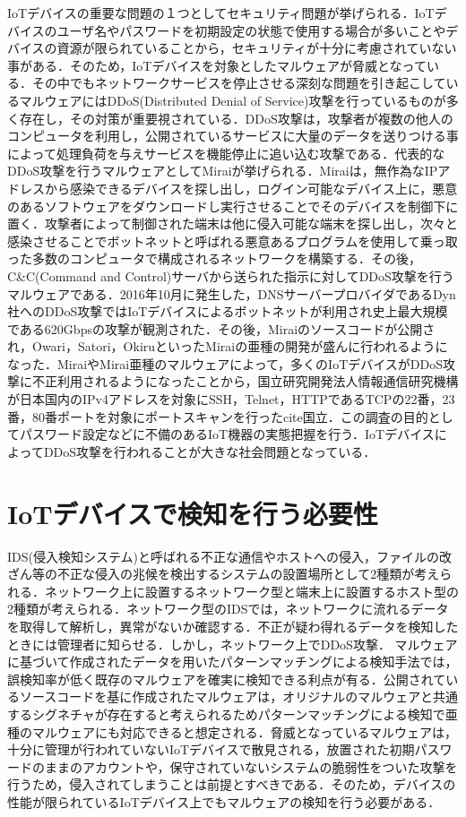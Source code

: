 IoTデバイスの重要な問題の１つとしてセキュリティ問題が挙げられる．IoTデバイスのユーザ名やパスワードを初期設定の状態で使用する場合が多いことやデバイスの資源が限られていることから，セキュリティが十分に考慮されていない事がある．そのため，IoTデバイスを対象としたマルウェアが脅威となっている．その中でもネットワークサービスを停止させる深刻な問題を引き起こしているマルウェアにはDDoS(Distributed Denial of Service)攻撃を行っているものが多く存在し，その対策が重要視されている．DDoS攻撃は，攻撃者が複数の他人のコンピュータを利用し，公開されているサービスに大量のデータを送りつける事によって処理負荷を与えサービスを機能停止に追い込む攻撃である．代表的なDDoS攻撃を行うマルウェアとしてMiraiが挙げられる．Mirai\cite{Mirai}は，無作為なIPアドレスから感染できるデバイスを探し出し，ログイン可能なデバイス上に，悪意のあるソフトウェアをダウンロードし実行させることでそのデバイスを制御下に置く．攻撃者によって制御された端末は他に侵入可能な端末を探し出し，次々と感染させることでボットネットと呼ばれる悪意あるプログラムを使用して乗っ取った多数のコンピュータで構成されるネットワークを構築する．その後，C\&C(Command and Control)サーバから送られた指示に対してDDoS攻撃を行うマルウェアである．2016年10月に発生した，DNSサーバープロバイダであるDyn社へのDDoS攻撃ではIoTデバイスによるボットネットが利用され史上最大規模である620Gbpsの攻撃が観測された\cite{Dyn}．その後，Miraiのソースコードが公開され，Owari，Satori，OkiruといったMiraiの亜種の開発が盛んに行われるようになった．MiraiやMirai亜種のマルウェアによって，多くのIoTデバイスがDDoS攻撃に不正利用されるようになったことから，国立研究開発法人情報通信研究機構が日本国内のIPv4アドレスを対象にSSH，Telnet，HTTPであるTCPの22番，23番，80番ポートを対象にポートスキャンを行ったcite{国立}．この調査の目的としてパスワード設定などに不備のあるIoT機器の実態把握を行う．IoTデバイスによってDDoS攻撃を行われることが大きな社会問題となっている．

\section{IoTデバイスで検知を行う必要性}

IDS(侵入検知システム)と呼ばれる不正な通信やホストへの侵入，ファイルの改ざん等の不正な侵入の兆候を検出するシステムの設置場所として2種類が考えられる．ネットワーク上に設置するネットワーク型と端末上に設置するホスト型の2種類が考えられる．ネットワーク型のIDSでは，ネットワークに流れるデータを取得して解析し，異常がないか確認する．不正が疑わ得れるデータを検知したときには管理者に知らせる．しかし，ネットワーク上でDDoS攻撃．
マルウェアに基づいて作成されたデータを用いたパターンマッチングによる検知手法では，誤検知率が低く既存のマルウェアを確実に検知できる利点が有る．公開されているソースコードを基に作成されたマルウェアは，オリジナルのマルウェアと共通するシグネチャが存在すると考えられるためパターンマッチングによる検知で亜種のマルウェアにも対応できると想定される．脅威となっているマルウェアは，十分に管理が行われていないIoTデバイスで散見される，放置された初期パスワードのままのアカウントや，保守されていないシステムの脆弱性をついた攻撃を行うため，侵入されてしまうことは前提とすべきである．そのため，デバイスの性能が限られているIoTデバイス上でもマルウェアの検知を行う必要がある．

